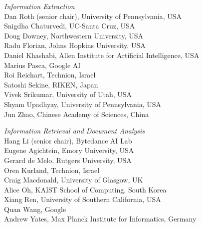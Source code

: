 \emph{Information Extraction}\\
\hspace*{0.2in}Dan Roth (senior chair), University of Pennsylvania, USA \\
\hspace*{0.2in}Snigdha Chaturvedi, UC-Santa Cruz, USA \\
\hspace*{0.2in}Doug Downey, Northwestern University, USA \\
\hspace*{0.2in}Radu Florian, Johns Hopkins University, USA \\
\hspace*{0.2in}Daniel Khashabi, Allen Institute for Artificial Intelligence, USA \\
\hspace*{0.2in}Marius Pasca, Google AI \\
\hspace*{0.2in}Roi Reichart, Technion, Israel \\
\hspace*{0.2in}Satoshi Sekine, RIKEN, Japan \\
\hspace*{0.2in}Vivek Srikumar, University of Utah, USA \\
\hspace*{0.2in}Shyam Upadhyay, University of Pennsylvania, USA \\
\hspace*{0.2in}Jun Zhao, Chinese Academy of Sciences, China


\emph{Information Retrieval and Document Analysis} \\
\hspace*{0.2in}Hang Li (senior chair), Bytedance AI Lab \\
\hspace*{0.2in}Eugene Agichtein, Emory University, USA \\
\hspace*{0.2in}Gerard de Melo, Rutgers University, USA \\
\hspace*{0.2in}Oren Kurland, Technion, Israel \\
\hspace*{0.2in}Craig Macdonald, University of Glasgow, UK \\
\hspace*{0.2in}Alice Oh, KAIST School of Computing, South Korea \\
\hspace*{0.2in}Xiang Ren, University of Southern California, USA \\
\hspace*{0.2in}Quan Wang, Google \\
\hspace*{0.2in}Andrew Yates, Max Planck Institute for Informatics, Germany 


